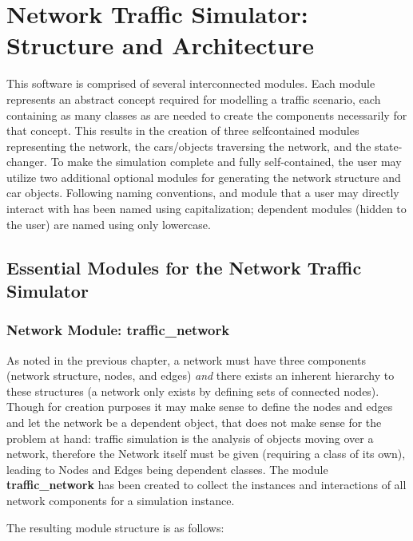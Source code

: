 \chapter{Network Traffic Simulator:  Structure and Architecture}
\label{Structure}

\par This software is comprised of several interconnected modules.  Each module represents an abstract concept required for modelling a traffic scenario, each containing as many classes as are needed to create the components necessarily for that concept.  This results in the creation of three self\-contained modules representing the network, the cars/objects traversing the network, and the state-changer.  To make the simulation complete and fully self-contained, the user may utilize two additional optional modules for generating the network structure and car objects. Following naming conventions, and module that a user may directly interact with has been named using capitalization; dependent modules (hidden to the user) are named using only lowercase.

\section{Essential Modules for the Network Traffic \\ Simulator}

\subsection{Network Module:  traffic\_network}

\par As noted in the previous chapter, a network must have three components (network structure, nodes, and edges) \textit{and} there exists an inherent hierarchy to these structures (a network only exists by defining sets of connected nodes).  Though for creation purposes it may make sense to define the nodes and edges and let the network be a dependent object, that does not make sense for the problem at hand:  traffic simulation is the analysis of objects moving over a network, therefore the Network itself must be given (requiring a class of its own), leading to Nodes and Edges being dependent classes.  The module \textbf{traffic\_network} has been created to collect the instances and interactions of all network components for a simulation instance.  \\

\par The resulting module structure is as follows:


